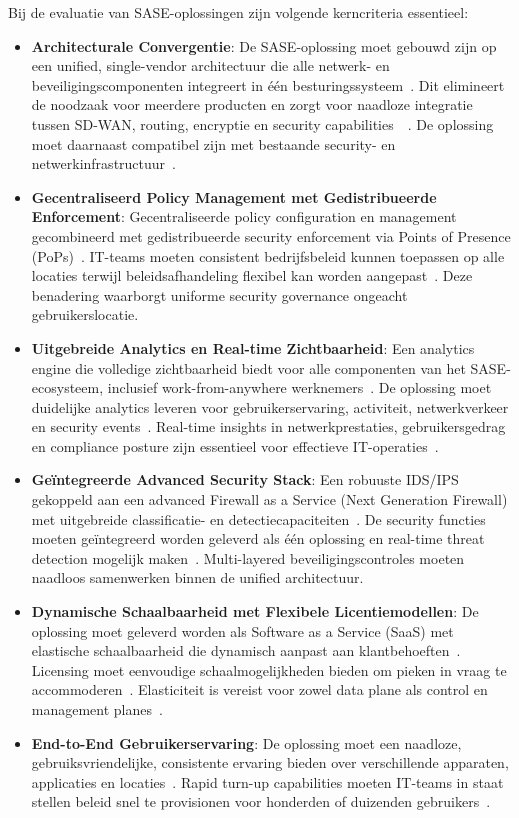 Bij de evaluatie van SASE-oplossingen zijn volgende kerncriteria essentieel:
\begin{itemize}
  \item \textbf{Architecturale Convergentie}: De SASE-oplossing moet gebouwd zijn op een unified, single-vendor architectuur die alle netwerk- en beveiligingscomponenten integreert in één besturingssysteem~\autocite{Taylor-2023}. 
  Dit elimineert de noodzaak voor meerdere producten en zorgt voor naadloze integratie tussen SD-WAN, routing, encryptie en security capabilities~\autocite{Taylor-2023}~\autocite{Anderson-2023}. De oplossing moet daarnaast compatibel zijn met bestaande security- en netwerkinfrastructuur~\autocite{Taylor-2023}.
  \item \textbf{Gecentraliseerd Policy Management met Gedistribueerde Enforcement}: Gecentraliseerde policy configuration en management gecombineerd met gedistribueerde security enforcement via Points of Presence (PoPs)~\autocite{Taylor-2023}. IT-teams moeten consistent bedrijfsbeleid kunnen toepassen op alle locaties terwijl beleidsafhandeling flexibel kan worden aangepast~\autocite{Anderson-2023}. Deze benadering waarborgt uniforme security governance ongeacht gebruikerslocatie.
  \item \textbf{Uitgebreide Analytics en Real-time Zichtbaarheid}: Een analytics engine die volledige zichtbaarheid biedt voor alle componenten van het SASE-ecosysteem, inclusief work-from-anywhere werknemers~\autocite{Anderson-2023}. De oplossing moet duidelijke analytics leveren voor gebruikerservaring, activiteit, netwerkverkeer en security events~\autocite{Taylor-2023}. Real-time insights in netwerkprestaties, gebruikersgedrag en compliance posture zijn essentieel voor effectieve IT-operaties~\autocite{Taylor-2023}.
  \item \textbf{Geïntegreerde Advanced Security Stack}: Een robuuste IDS/IPS gekoppeld aan een advanced Firewall as a Service (Next Generation Firewall) met uitgebreide classificatie- en detectiecapaciteiten~\autocite{Taylor-2023}. De security functies moeten geïntegreerd worden geleverd als één oplossing en real-time threat detection mogelijk maken~\autocite{Anderson-2023}. Multi-layered beveiligingscontroles moeten naadloos samenwerken binnen de unified architectuur.
  \item \textbf{Dynamische Schaalbaarheid met Flexibele Licentiemodellen}: De oplossing moet geleverd worden als Software as a Service (SaaS) met elastische schaalbaarheid die dynamisch aanpast aan klantbehoeften~\autocite{Taylor-2023}. Licensing moet eenvoudige schaalmogelijkheden bieden om pieken in vraag te accommoderen~\autocite{Anderson-2023}. Elasticiteit is vereist voor zowel data plane als control en management planes~\autocite{Taylor-2023}.
  \item \textbf{End-to-End Gebruikerservaring}: De oplossing moet een naadloze, gebruiksvriendelijke, consistente ervaring bieden over verschillende apparaten, applicaties en locaties~\autocite{Anderson-2023}. Rapid turn-up capabilities moeten IT-teams in staat stellen beleid snel te provisionen voor honderden of duizenden gebruikers~\autocite{Anderson-2023}.
\end{itemize}


